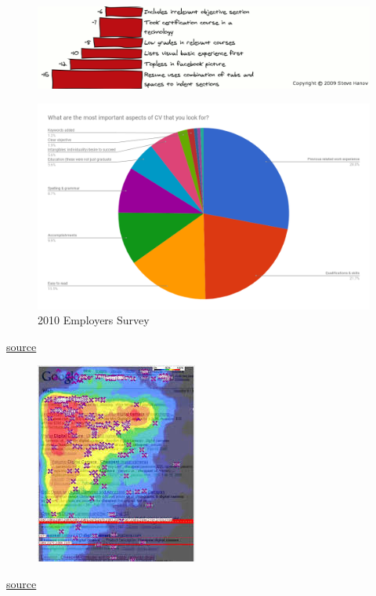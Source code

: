 \begin{frame}
	\begin{figure}
		\includegraphics[scale=.35]{assets/diff3}
	\end{figure}
\end{frame}

\begin{frame}
	\begin{figure}
		\includegraphics[scale=.27]{assets/priority}
		\caption{2010 Employers Survey}
	\end{figure}
	\href{http://stevehanov.ca/blog/resume_comic.png}{source}
\end{frame}

\begin{frame}
	\begin{figure}
		\includegraphics[scale=.8]{assets/golden-triangle}
		
	\end{figure}
	\href{www.forbes.com/sites/roberthof/2015/03/03/how-do-you-google-new-eye-tracking-study-reveals-huge-changes/\#604c90423828}{source}
\end{frame}


